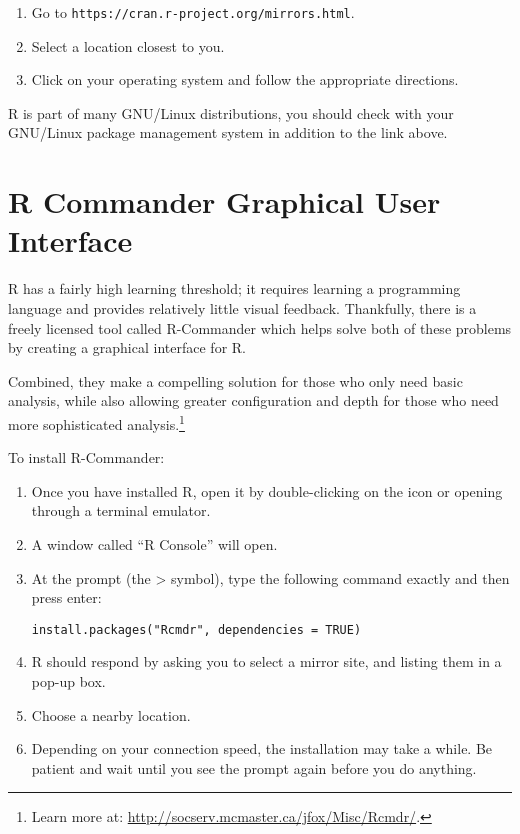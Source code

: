 \begin{enumerate}
 \item Go to \texttt{https://cran.r-project.org/mirrors.html}.
 \item Select a location closest to you.
 \item Click on your operating system and follow the appropriate directions.
\end{enumerate}

R is part of many GNU/Linux distributions, you should check with your GNU/Linux
 package management system in addition to the link above.

\section{R Commander Graphical User Interface}
R has a fairly high learning threshold; it requires learning a programming 
language and provides relatively little visual feedback. Thankfully, there is a
 freely licensed tool called R-Commander which helps solve both of these 
problems by creating a graphical interface for R.

Combined, they make a compelling solution for those who only need basic 
analysis, while also allowing greater configuration and depth for those who 
need more sophisticated analysis.\footnote{Learn more at: \url{http://socserv.mcmaster.ca/jfox/Misc/Rcmdr/}.}

To install R-Commander:

\begin{enumerate}
 \item Once you have installed R, open it by double-clicking on the icon or 
 opening through a terminal emulator.
 \item A window called “R Console” will open.
 \item At the prompt (the > symbol), type the following command exactly and 
 then press enter:

\texttt{install.packages("Rcmdr", dependencies = TRUE)}

 \item R should respond by asking you to select a mirror site, and listing them
  in a pop-up box.
 \item Choose a nearby location.
 \item Depending on your connection speed, the installation may take a while. 
 Be patient and wait until you see the prompt again before you do anything.
\end{enumerate}
 
